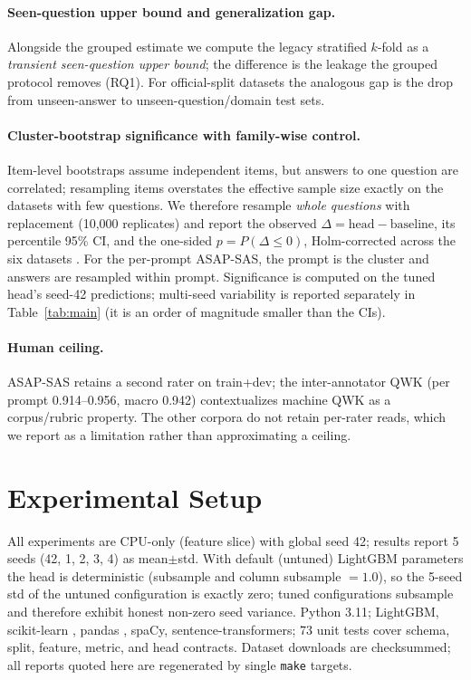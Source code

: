 \documentclass[11pt]{article}
\begin{document}
\paragraph{Seen-question upper bound and generalization gap.}
Alongside the grouped estimate we compute the legacy stratified $k$-fold as a
\emph{transient seen-question upper bound}; the difference is the leakage the
grouped protocol removes (RQ1). For official-split datasets the analogous gap
is the drop from unseen-answer to unseen-question/domain test sets.

\paragraph{Cluster-bootstrap significance with family-wise control.}
Item-level bootstraps assume independent items, but answers to one question are
correlated; resampling items overstates the effective sample size exactly on
the datasets with few questions. We therefore resample \emph{whole questions}
with replacement (10{,}000 replicates) and report the observed
$\Delta=\text{head}-\text{baseline}$, its percentile 95\% CI, and the one-sided
$p=P(\Delta\le 0)$, Holm-corrected across the six datasets
\cite{efron1993bootstrap,holm1979simple}. For the per-prompt ASAP-SAS, the
prompt is the cluster and answers are resampled within prompt. Significance is
computed on the tuned head's seed-42 predictions; multi-seed variability is
reported separately in Table~\ref{tab:main} (it is an order of magnitude
smaller than the CIs).

\paragraph{Human ceiling.}
ASAP-SAS retains a second rater on train+dev; the inter-annotator QWK
(per prompt 0.914--0.956, macro 0.942) contextualizes machine QWK as a
corpus/rubric property. The other corpora do not retain per-rater reads, which
we report as a limitation rather than approximating a ceiling.

\section{Experimental Setup}
\label{sec:setup}

All experiments are CPU-only (feature slice) with global seed 42; results
report 5 seeds (42, 1, 2, 3, 4) as mean$\pm$std. With default (untuned)
LightGBM parameters the head is deterministic (subsample and column subsample
$=1.0$), so the 5-seed std of the untuned configuration is exactly zero; tuned
configurations subsample and therefore exhibit honest non-zero seed variance.
Python 3.11; LightGBM, scikit-learn \cite{pedregosa2011scikit}, pandas
\cite{mckinney2010pandas}, spaCy, sentence-transformers; 73 unit tests cover
schema, split, feature, metric, and head contracts. Dataset downloads are
checksummed; all reports quoted here are regenerated by single \texttt{make}
targets.
\end{document}
